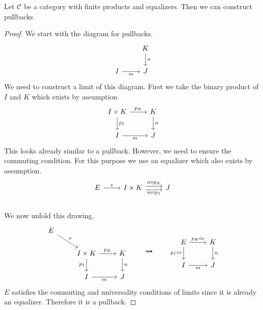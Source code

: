 \begin{theorem}
  \label{pullbackconstruction}
  Let $\mathscr C$ be a category with finite products and equalizers.
  Then we can construct pullbacks.
\end{theorem}
\begin{proof}
We start with the diagram for pullbacks.
\[
  \begin{tikzcd}
    & K \arrow{d}{n} \\
    I \arrow[swap]{r}{m} & J
  \end{tikzcd}
\]
We need to construct a limit of this diagram.
First we take the binary product of $I$ and $K$ which exists by assumption.
\[
  \begin{tikzcd}
    I \times K \arrow{r}{p_K} \arrow{d}{p_I} & K \arrow{d}{n} \\
    I \arrow[swap]{r}{m} & J
  \end{tikzcd}
\]
This looks already similar to a pullback.
However, we need to ensure the commuting condition.
For this purpose we use an equalizer which also exists by assumption.
\[
  \begin{tikzcd}
    E \arrow{r}{e} &
    I \times K
    \arrow[r,shift right,swap, "m \circ p_I"] \arrow[r,shift left, "n \circ p_K"]
    & J \\
  \end{tikzcd}
\]
We now unfold this drawing.
\[
  \begin{tikzcd}
    E \arrow{dr}{e}& &\\
    & I \times K \arrow[swap]{d}{p_I} \arrow{r}{p_K}& K \arrow{d}{n}\\
    & I \arrow[swap]{r}{m} & J
  \end{tikzcd}
  \qquad \bm{\rightsquigarrow} \qquad 
  \begin{tikzcd}
    E \arrow[swap]{d}{p_I \circ e} \arrow{r}{p_K \circ e} & K \arrow{d}{n} \\
    I \arrow[swap]{r}{m} & J
  \end{tikzcd}
\]
$E$ satisfies the commuting and universality conditions of limits
since it is already an equalizer.
Therefore it is a pullback.
\end{proof}

